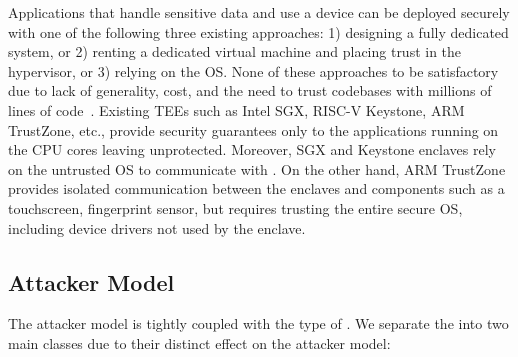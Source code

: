 

Applications that handle sensitive data and use a \sphw device can be deployed securely with one of the following three existing approaches: 1) designing a fully dedicated system, or 2) renting a dedicated virtual machine and placing trust in the hypervisor, or 3) relying on the OS. None of these approaches to be satisfactory due to lack of generality, cost, and the need to trust codebases with millions of lines of code~\cite{torvalds2020linux,barham2003xen}. Existing TEEs such as Intel SGX, RISC-V Keystone, ARM TrustZone, etc., provide security guarantees only to the applications running on the CPU cores leaving \sphw unprotected. Moreover, SGX and Keystone enclaves rely on the untrusted OS to communicate with \sphw. On the other hand, ARM TrustZone provides isolated communication between the enclaves and components such as a touchscreen, fingerprint sensor, but requires trusting the entire secure OS, including device drivers not used by the enclave.  %


\subsection{Attacker Model}
\label{sec:problemStatement:attackerModel}

The attacker model is tightly coupled with the type of \sphw. We separate the \sphw into two main classes due to their distinct effect on the attacker model: 

